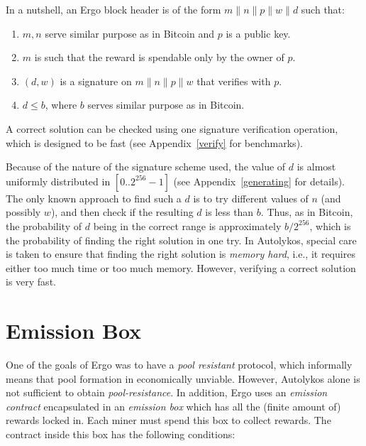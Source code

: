 \documentclass[11pt]{article}
\newcommand{\powname}{Autolykos\xspace}
\begin{document}
In a nutshell, an Ergo block header is of the form $m\|n\|p\|w\|d$ such that:
\begin{enumerate}
	\item $m, n$ serve similar purpose as in Bitcoin and $p$ is a public key.
	\item $m$ is such that the reward is spendable only by the owner of $p$.
	\item $(d, w)$ is a signature on $m\|n\|p\|w$ that verifies with $p$.
	\item $d\leq b$, where $b$ serves similar purpose as in Bitcoin. 
\end{enumerate}

A correct solution can be checked using one signature verification operation, which is designed to be fast (see Appendix~\ref{verify} for benchmarks).

Because of the nature of the signature scheme used, the value of $d$ is almost uniformly distributed in $[0..2^{256}-1]$ (see Appendix~\ref{generating} for details). The only known approach to find such a $d$ is to try different values of $n$ (and possibly $w$), and then check if the resulting $d$ is less than $b$.
Thus, as in Bitcoin, the probability of $d$ being in the correct range is approximately $b/2^{256}$, which is the probability of finding the right solution in one try.
In \powname, special care is taken to ensure that finding the right solution is {\em memory hard}, i.e., it requires either too much time or too much memory. However, verifying a correct solution is very fast.
\section{Emission Box}

\label{emission}

One of the goals of Ergo was to have a {\em pool resistant} protocol, which informally means that pool formation in economically unviable.
However, \powname alone is not sufficient to obtain {\em pool-resistance}. In addition, Ergo uses an {\em emission contract} encapsulated in an {\em emission box} which has all the (finite amount of) rewards locked in. Each miner must spend this box to collect rewards. The contract inside this box has the following conditions:
\end{document}
